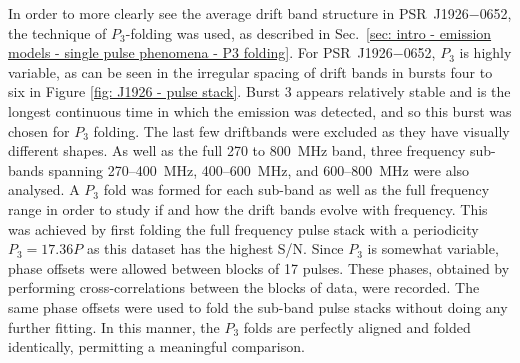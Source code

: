 In order to more clearly see the average drift band structure in PSR~J1926$-$0652, the technique of $P_3$-folding was used, as described in Sec.~\ref{sec: intro - emission models - single pulse phenomena - P3 folding}. For PSR~J1926$-$0652, $P_3$ is highly variable, as can be seen in the irregular spacing of drift bands in bursts four to six in Figure \ref{fig: J1926 - pulse stack}. Burst 3 appears relatively stable and is the longest continuous time in which the emission was detected, and so this burst was chosen for $P_3$ folding. The last few driftbands were excluded as they have visually different shapes. As well as the full 270 to 800~MHz band, three frequency sub-bands spanning 270--400~MHz, 400--600~MHz, and 600--800~MHz were also analysed. A $P_3$ fold was formed for each sub-band as well as the full frequency range in order to study if and how the drift bands evolve with frequency. This was achieved by first folding the full frequency pulse stack with a periodicity $P_3 = 17.36P$ as this dataset has the highest S/N. Since $P_3$ is somewhat variable, phase offsets were allowed between blocks of 17 pulses. These phases, obtained by performing cross-correlations between the blocks of data, were recorded. The same phase offsets were used to fold the sub-band pulse stacks without doing any further fitting. In this manner, the $P_3$ folds are perfectly aligned and folded identically, permitting a meaningful comparison.

